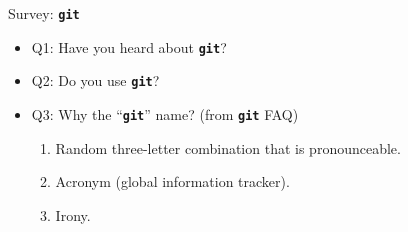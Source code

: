 \documentclass{beamer}
\newcommand{\git}{\texttt{\textbf{git}}\xspace}
\begin{document}

\begin{frame}{Survey: \git}
  \begin{itemize}\setlength{\itemsep}{+3mm}
  \item Q1: Have you heard about \git?
  \item Q2: Do you use \git?
  \item Q3: Why the ``\git'' name? (from \git FAQ)
    \begin{enumerate}\setlength{\itemsep}{+2mm}
    \item Random three-letter combination that is pronounceable.
    \item Acronym (global information tracker).
    \item Irony.
    \end{enumerate}
  \end{itemize}
\end{frame}
\end{document}
